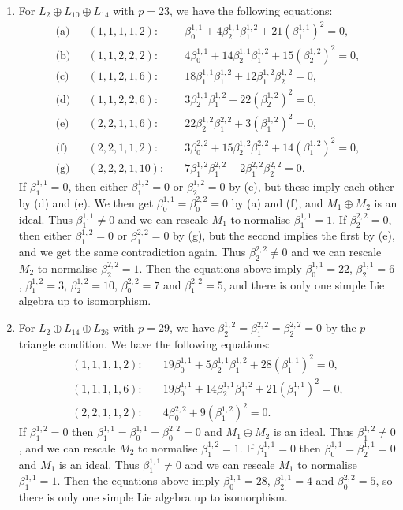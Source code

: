 \documentclass[11pt,a4paper,reqno]{amsart}
\theoremstyle{definition}
\numberwithin{equation}{section}
\begin{document}
\begin{enumerate}
\item For $L_2\oplus L_{10}\oplus L_{14}$ with $p=23$, we have the following equations:
\begin{align*}
\text{(a)}&&(1,1,1,1,2):\quad&\textstyle \beta^{1,1}_0+4\beta^{1,1}_2\beta^{1,2}_1+21(\beta^{1,1}_1)^2=0,\\
\text{(b)}&&(1,1,2,2,2):\quad&\textstyle 4\beta^{1,1}_0+14\beta^{1,1}_2\beta^{1,2}_1+15(\beta^{1,2}_2)^2=0,\\
\text{(c)}&&(1,1,2,1,6):\quad&\textstyle 18\beta^{1,1}_1\beta^{1,2}_1+12\beta^{1,2}_1\beta^{1,2}_2=0,\\
\text{(d)}&&(1,1,2,2,6):\quad&\textstyle 3\beta^{1,1}_2\beta^{1,2}_1+22(\beta^{1,2}_2)^2=0,\\
\text{(e)}&&(2,2,1,1,6):\quad&\textstyle 22\beta^{1,2}_2\beta^{2,2}_1+3(\beta^{1,2}_1)^2=0,\\
\text{(f)}&&(2,2,1,1,2):\quad&\textstyle 3\beta^{2,2}_0+15\beta^{1,2}_2\beta^{2,2}_1+14(\beta^{1,2}_1)^2=0,\\
\text{(g)}&&(2,2,2,1,10):\quad&\textstyle 7\beta^{1,2}_1\beta^{2,2}_1+2\beta^{2,2}_1\beta^{2,2}_2=0.
\end{align*}
If $\beta^{1,1}_1=0$, then either $\beta^{1,2}_1=0$ or $\beta^{1,2}_2=0$ by (c), but these imply each other by (d) and (e). We then get $\beta^{1,1}_0=\beta^{2,2}_0=0$ by (a) and (f), and $M_1\oplus M_2$ is an ideal. Thus $\beta^{1,1}_1\neq0$ and we can rescale $M_1$ to normalise $\beta^{1,1}_1=1$. If $\beta^{2,2}_2=0$, then either $\beta^{1,2}_1=0$ or $\beta^{2,2}_1=0$ by (g), but the second implies the first by (e), and we get the same contradiction again. Thus $\beta^{2,2}_2\neq0$ and we can rescale $M_2$ to normalise $\beta^{2,2}_2=1$. Then the equations above imply $\beta^{1,1}_0=22$, $\beta^{1,1}_2=6$, $\beta^{1,2}_1=3$, $\beta^{1,2}_2=10$, $\beta^{2,2}_0=7$ and $\beta^{2,2}_1=5$, and there is only one simple Lie algebra up to isomorphism.

\item For $L_2\oplus L_{14}\oplus L_{26}$ with $p=29$, we have $\beta^{1,2}_2=\beta^{2,2}_1=\beta^{2,2}_2=0$ by the $p$-triangle condition. We have the following equations:
\begin{align*}
(1,1,1,1,2):\quad&\textstyle 19\beta^{1,1}_0+5\beta^{1,1}_2\beta^{1,2}_1+28(\beta^{1,1}_1)^2=0,\\
(1,1,1,1,6):\quad&\textstyle 19\beta^{1,1}_0+14\beta^{1,1}_2\beta^{1,2}_1+21(\beta^{1,1}_1)^2=0,\\
(2,2,1,1,2):\quad&\textstyle 4\beta^{2,2}_0+9(\beta^{1,2}_1)^2=0.
\end{align*}
If $\beta^{1,2}_1=0$ then $\beta^{1,1}_1=\beta^{1,1}_0=\beta^{2,2}_0=0$ and $M_1\oplus M_2$ is an ideal. Thus $\beta^{1,2}_1\neq0$, and we can rescale $M_2$ to normalise $\beta^{1,2}_1=1$. If $\beta^{1,1}_1=0$ then $\beta^{1,1}_0=\beta^{1,1}_2=0$ and $M_1$ is an ideal. Thus $\beta^{1,1}_1\neq0$ and we can rescale $M_1$ to normalise $\beta^{1,1}_1=1$. Then the equations above imply $\beta^{1,1}_0=28$, $\beta^{1,1}_2=4$ and $\beta^{2,2}_0=5$, so there is only one simple Lie algebra up to isomorphism.
\end{enumerate}
\end{document}
